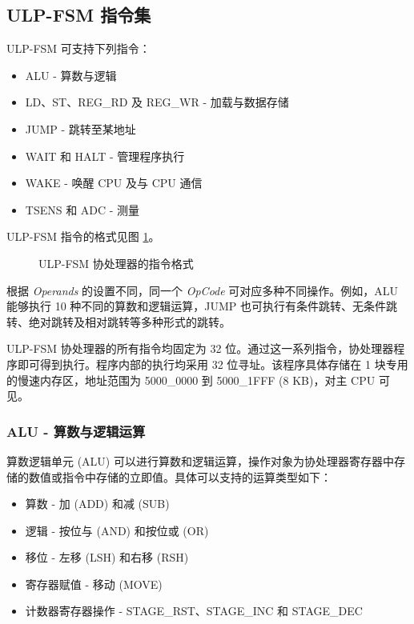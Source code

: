 \documentclass[main\_\_CN.tex]{subfiles}
\begin{document}
\subsection{ULP-FSM 指令集} \label{section:instruction-set}

ULP-FSM 可支持下列指令：

\begin{itemize}
    \item ALU - 算数与逻辑
    \item LD、ST、REG\_RD 及 REG\_WR - 加载与数据存储
    \item JUMP - 跳转至某地址
    \item WAIT 和 HALT - 管理程序执行
    \item WAKE - 唤醒 CPU 及与 CPU 通信
    \item TSENS 和 ADC - 测量
\end{itemize}

ULP-FSM 指令的格式见图 \ref{figure:ULP-instruction}。

%
%
\begin{figure}[!ht]
    \centering
    \caption{ULP-FSM 协处理器的指令格式}
    \label{figure:ULP-instruction}
\end{figure}

根据 \textit{Operands} 的设置不同，同一个 \textit{OpCode} 可对应多种不同操作。例如，ALU 能够执行 10 种不同的算数和逻辑运算，JUMP 也可执行有条件跳转、无条件跳转、绝对跳转及相对跳转等多种形式的跳转。

ULP-FSM 协处理器的所有指令均固定为 32 位。通过这一系列指令，协处理器程序即可得到执行。程序内部的执行均采用 32 位寻址。该程序具体存储在 1 块专用的慢速内存区，地址范围为 \hexprefix{}5000\_0000 到 \hexprefix{}5000\_1FFF (8 KB)，对主 CPU 可见。



\subsubsection{ALU - 算数与逻辑运算} \label{paragraph:ALU}

算数逻辑单元 (ALU) 可以进行算数和逻辑运算，操作对象为协处理器寄存器中存储的数值或指令中存储的立即值。具体可以支持的运算类型如下：
\begin{itemize}
    \item 算数 - 加 (ADD) 和减 (SUB)
    \item 逻辑 - 按位与 (AND) 和按位或 (OR)
    \item 移位 - 左移 (LSH) 和右移 (RSH)
    \item 寄存器赋值 - 移动 (MOVE)
    \item 计数器寄存器操作 - STAGE\_RST、STAGE\_INC 和 STAGE\_DEC
\end{itemize}
\end{document}
